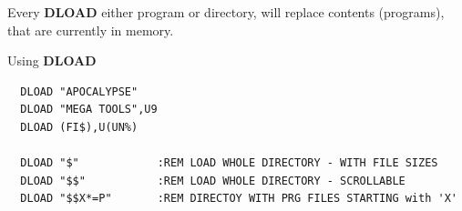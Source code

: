 \begin{description}[leftmargin=2cm,style=nextline]
   Every {\bf DLOAD} either program or directory, will replace
   contents (programs), that are currently in memory.

\item [Examples:] Using {\bf DLOAD}
\begin{tcolorbox}[colback=black,coltext=white]
\verbatimfont{\codefont}
\begin{verbatim}
  DLOAD "APOCALYPSE"
  DLOAD "MEGA TOOLS",U9
  DLOAD (FI$),U(UN%)

  DLOAD "$"            :REM LOAD WHOLE DIRECTORY - WITH FILE SIZES
  DLOAD "$$"           :REM LOAD WHOLE DIRECTORY - SCROLLABLE
  DLOAD "$$X*=P"       :REM DIRECTOY WITH PRG FILES STARTING with 'X'
\end{verbatim}
\end{tcolorbox}
\end{description}


\newpage
